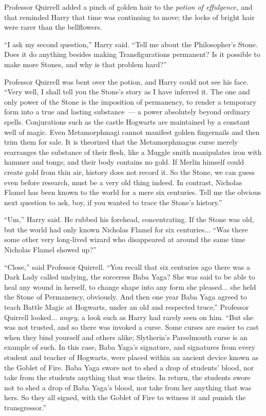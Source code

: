 Professor Quirrell added a pinch of golden hair to the \emph{potion of effulgence,} and that reminded Harry that time was continuing to move; the locks of bright hair were rarer than the bellflowers.

``I ask my second question,'' Harry said. ``Tell me about the Philosopher's Stone. Does it do anything besides making Transfigurations permanent? Is it possible to make more Stones, and why is that problem hard?''

Professor Quirrell was bent over the potion, and Harry could not see his face. ``Very well, I shall tell you the Stone's story as I have inferred it. The one and only power of the Stone is the imposition of permanency, to render a temporary form into a true and lasting substance~--- a power absolutely beyond ordinary spells. Conjurations such as the castle Hogwarts are maintained by a constant well of magic. Even Metamorphmagi cannot manifest golden fingernails and then trim them for sale. It is theorized that the Metamorphmagus curse merely rearranges the substance of their flesh, like a Muggle smith manipulates iron with hammer and tongs; and their body contains no gold. If Merlin himself could create gold from thin air, history does not record it. So the Stone, we can guess even before research, must be a very old thing indeed. In contrast, Nicholas Flamel has been known to the world for a mere six centuries. Tell me the obvious next question to ask, boy, if you wanted to trace the Stone's history.''

``Um,'' Harry said. He rubbed his forehead, concentrating. If the Stone was old, but the world had only known Nicholas Flamel for six centuries... ``Was there some other very long-lived wizard who disappeared at around the same time Nicholas Flamel showed up?''

``Close,'' said Professor Quirrell. ``You recall that six centuries ago there was a Dark Lady called undying, the sorceress Baba Yaga? She was said to be able to heal any wound in herself, to change shape into any form she pleased... she held the Stone of Permanency, obviously. And then one year Baba Yaga agreed to teach Battle Magic at Hogwarts, under an old and respected truce.'' Professor Quirrell looked... \emph{angry,} a look such as Harry had rarely seen on him. ``But she was not trusted, and so there was invoked a curse. Some curses are easier to cast when they bind yourself and others alike; Slytherin's Parselmouth curse is an example of such. In this case, Baba Yaga's signature, and signatures from every student and teacher of Hogwarts, were placed within an ancient device known as the Goblet of Fire. Baba Yaga swore not to shed a drop of students' blood, nor take from the students anything that was theirs. In return, the students swore not to shed a drop of Baba Yaga's blood, nor take from her anything that was hers. So they all signed, with the Goblet of Fire to witness it and punish the transgressor.''

